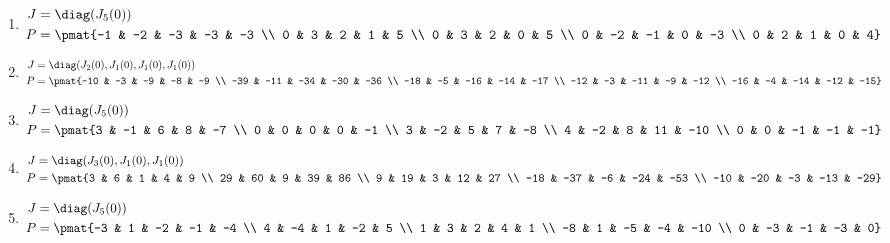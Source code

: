 \begin{enumerate}
\item

\begin{align*}
J &= \diag(J_{5}(0))\\
P &= \pmat{-1 & -2 & -3 & -3 & -3 \\ 0 & 3 & 2 & 1 & 5 \\ 0 & 3 & 2 & 0 & 5 \\ 0 & -2 & -1 & 0 & -3 \\ 0 & 2 & 1 & 0 & 4}
\end{align*}

\item

\begin{align*}
J &= \diag(J_{2}(0), J_{1}(0), J_{1}(0), J_{1}(0))\\
P &= \pmat{-10 & -3 & -9 & -8 & -9 \\ -39 & -11 & -34 & -30 & -36 \\ -18 & -5 & -16 & -14 & -17 \\ -12 & -3 & -11 & -9 & -12 \\ -16 & -4 & -14 & -12 & -15}
\end{align*}

\item

\begin{align*}
J &= \diag(J_{5}(0))\\
P &= \pmat{3 & -1 & 6 & 8 & -7 \\ 0 & 0 & 0 & 0 & -1 \\ 3 & -2 & 5 & 7 & -8 \\ 4 & -2 & 8 & 11 & -10 \\ 0 & 0 & -1 & -1 & -1}
\end{align*}

\item

\begin{align*}
J &= \diag(J_{3}(0), J_{1}(0), J_{1}(0))\\
P &= \pmat{3 & 6 & 1 & 4 & 9 \\ 29 & 60 & 9 & 39 & 86 \\ 9 & 19 & 3 & 12 & 27 \\ -18 & -37 & -6 & -24 & -53 \\ -10 & -20 & -3 & -13 & -29}
\end{align*}

\item

\begin{align*}
J &= \diag(J_{5}(0))\\
P &= \pmat{-3 & 1 & -2 & -1 & -4 \\ 4 & -4 & 1 & -2 & 5 \\ 1 & 3 & 2 & 4 & 1 \\ -8 & 1 & -5 & -4 & -10 \\ 0 & -3 & -1 & -3 & 0}
\end{align*}


\end{enumerate}
